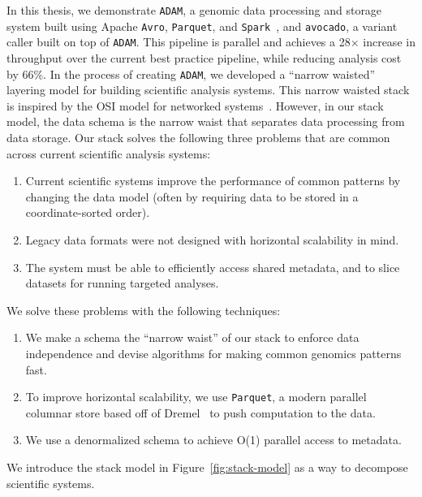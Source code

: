 \documentclass[masters]{ucbthesis}
\begin{document}
In this thesis, we demonstrate \texttt{ADAM}, a genomic data processing and storage system built using
Apache \texttt{Avro}, \texttt{Parquet}, and \texttt{Spark}~\cite{avro, parquet, zaharia10}, and \texttt{avocado}, a variant caller
built on top of \texttt{ADAM}. This pipeline is parallel and achieves a 28$\times$ increase in throughput over the current
best practice pipeline, while reducing analysis cost by 66\%. In the process of creating \texttt{ADAM},
we developed a ``narrow waisted'' layering model for building scientific analysis systems. This narrow
waisted stack is inspired by the OSI model for networked systems~\cite{zimmermann80}. However, in our
stack model, the data schema is the narrow waist that separates data processing from data storage. Our
stack solves the following three problems that are common across current scientific analysis systems:

\begin{enumerate}
\item Current scientific systems improve the performance of common patterns by changing the data
model (often by requiring data to be stored in a coordinate-sorted order).
\item Legacy data formats were not designed with horizontal scalability in mind.
\item The system must be able to efficiently access shared metadata, and to slice datasets for running
targeted analyses.
\end{enumerate}

We solve these problems with the following techniques:

\begin{enumerate}
\item We make a schema the ``narrow waist'' of our stack to enforce data independence and
devise algorithms for making common genomics patterns fast.
\item To improve horizontal scalability, we use \texttt{Parquet}, a modern parallel columnar store based off of
Dremel~\cite{melnik10} to push computation to the data.
\item We use a denormalized schema to achieve O(1) parallel access to metadata.
\end{enumerate}

We introduce the stack model in Figure~\ref{fig:stack-model} as a way to decompose scientific systems.
\end{document}
